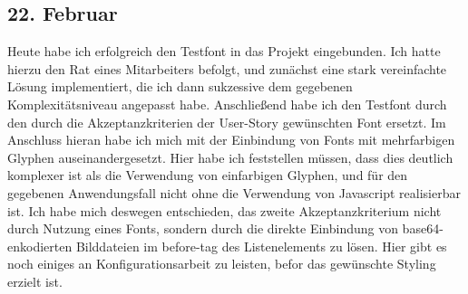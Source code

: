 \subsection{22. Februar}
Heute habe ich erfolgreich den Testfont in das Projekt eingebunden. Ich hatte hierzu den Rat eines Mitarbeiters befolgt, und zunächst eine stark vereinfachte Lösung implementiert, die ich dann sukzessive dem gegebenen Komplexitätsniveau angepasst habe. Anschließend habe ich den Testfont durch den durch die Akzeptanzkriterien der User-Story gewünschten Font ersetzt. Im Anschluss hieran habe ich mich mit der Einbindung von Fonts mit mehrfarbigen Glyphen auseinandergesetzt. Hier habe ich feststellen müssen, dass dies deutlich komplexer ist als die Verwendung von einfarbigen Glyphen, und für den gegebenen Anwendungsfall nicht ohne die Verwendung von Javascript realisierbar ist. Ich habe mich deswegen entschieden, das zweite Akzeptanzkriterium nicht durch Nutzung eines Fonts, sondern durch die direkte Einbindung von base64-enkodierten Bilddateien im before-tag des Listenelements zu lösen. Hier gibt es noch einiges an Konfigurationsarbeit zu leisten, befor das gewünschte Styling erzielt ist.